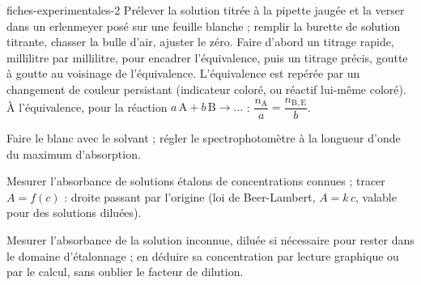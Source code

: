 \begin{blocEdition}{fiches-experimentales-2}
\fontsize{10}{13.5}\selectfont
\label{figedition-fiches-2}
Prélever la solution titrée à la pipette jaugée et la verser dans un erlenmeyer posé sur une feuille blanche ; remplir la burette
de solution titrante, chasser la bulle d'air, ajuster le zéro. Faire d'abord un titrage rapide, millilitre par millilitre, pour
encadrer l'équivalence, puis un titrage précis, goutte à goutte au voisinage de l'équivalence. L'équivalence est repérée par un
changement de couleur persistant (indicateur coloré, ou réactif lui-même coloré). À l'équivalence, pour la réaction
$a\,\mathrm{A}+b\,\mathrm{B}\to\ldots$ : $\dfrac{n_\mathrm{A}}{a}=\dfrac{n_{\mathrm{B},\mathrm{E}}}{b}$.
\begin{questions}
\item Faire le blanc avec le solvant ; régler le spectrophotomètre à la longueur d'onde du maximum d'absorption.
\item Mesurer l'absorbance de solutions étalons de concentrations connues ; tracer $A=f(c)$ : droite passant par l'origine (loi de
Beer-Lambert, $A=k\,c$, valable pour des solutions diluées).
\item Mesurer l'absorbance de la solution inconnue, diluée si nécessaire pour rester dans le domaine d'étalonnage ; en déduire
sa concentration par lecture graphique ou par le calcul, sans oublier le facteur de dilution.
\end{questions}
\end{blocEdition}

